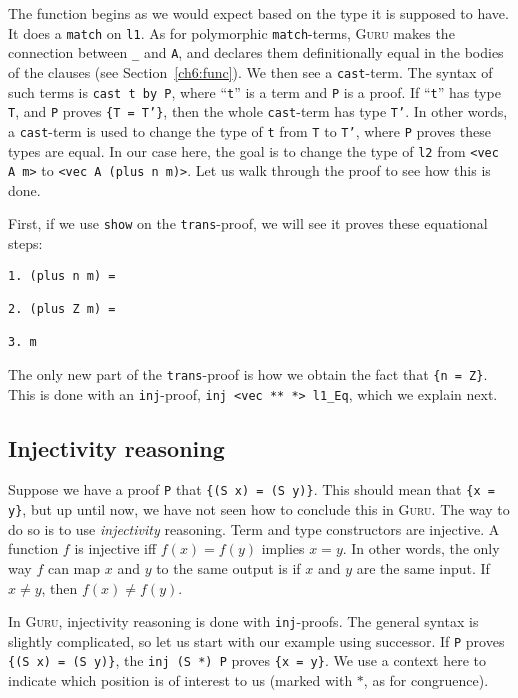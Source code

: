 \documentclass{book}[12pt]
\newcommand{\guru}[0]{\textsc{Guru}\xspace}
\begin{document}
\noindent The function begins as we would expect based on the type it
is supposed to have.  It does a \texttt{match} on \texttt{l1}.  As for
polymorphic \texttt{match}-terms, \guru makes the connection between
\texttt{\_} and \texttt{A}, and declares them definitionally equal in
the bodies of the clauses (see Section~\ref{ch6:func}).  We then see a
\texttt{cast}-term.  The syntax of such terms is \texttt{cast t by P},
where ``\texttt{t}'' is a term and \texttt{P} is a proof.  If
``\texttt{t}'' has type \texttt{T}, and \texttt{P} proves \texttt{\{T
= T'\}}, then the whole \texttt{cast}-term has type \texttt{T'}.  In
other words, a \texttt{cast}-term is used to change the type of
\texttt{t} from \texttt{T} to \texttt{T'}, where \texttt{P} proves
these types are equal.  In our case here, the goal is to change the
type of \texttt{l2} from \texttt{<vec A m>} to \texttt{<vec A (plus n
m)>}.  Let us walk through the proof to see how this is done.

First, if we use \texttt{show} on the \texttt{trans}-proof, we will
see it proves these equational steps:

\begin{verbatim}
1. (plus n m) =

2. (plus Z m) =

3. m
\end{verbatim}

\noindent The only new part of the \texttt{trans}-proof is how we obtain
the fact that \texttt{\{n = Z\}}.  This is done with an \texttt{inj}-proof,
\texttt{inj <vec ** *> l1\_Eq}, which we explain next.

\subsection{Injectivity reasoning}

Suppose we have a proof \texttt{P} that \texttt{\{(S x) = (S y)\}}.
This should mean that \texttt{\{x = y\}}, but up until now, we have
not seen how to conclude this in \guru.  The way to do so is to use
\emph{injectivity} reasoning.  Term and type constructors are
injective.  A function $f$ is injective iff $f(x) = f(y)$ implies $x =
y$.  In other words, the only way $f$ can map $x$ and $y$ to the same
output is if $x$ and $y$ are the same input.  If $x \neq y$, then
$f(x) \neq f(y)$.

In \guru, injectivity reasoning is done with \texttt{inj}-proofs.  The
general syntax is slightly complicated, so let us start with our
example using successor.  If \texttt{P} proves \texttt{\{(S x) = (S
y)\}}, the \texttt{inj (S *) P} proves \texttt{\{x = y\}}.  We use a
context here to indicate which position is of interest to us (marked
with $*$, as for congruence).
\end{document}
